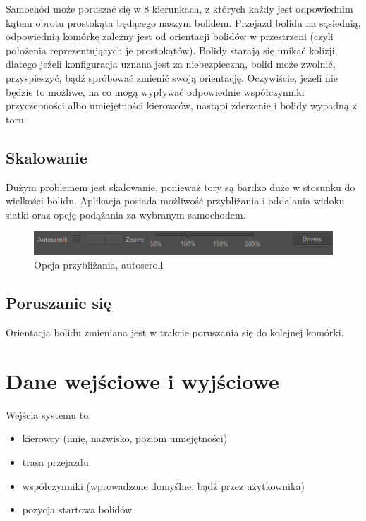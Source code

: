 \documentclass{article}
\begin{document}
Samochód może poruszać się w 8 kierunkach, z których każdy jest odpowiednim kątem obrotu prostokąta będącego naszym bolidem. Przejazd bolidu na sąsiednią, odpowiednią komórkę zależny jest od orientacji bolidów w przestrzeni (czyli położenia reprezentujących je prostokątów). Bolidy starają się unikać kolizji, dlatego jeżeli konfiguracja uznana jest za niebezpieczną, bolid może zwolnić, przyspieszyć, bądź spróbować zmienić swoją orientację. Oczywiście, jeżeli nie będzie to możliwe, na co mogą wypływać odpowiednie współczynniki przyczepności albo umiejętności kierowców, nastąpi zderzenie i bolidy wypadną z toru.   \\

\subsection{Skalowanie}
Dużym problemem jest skalowanie, ponieważ tory są bardzo duże w stosunku do wielkości bolidu. Aplikacja posiada możliwość przybliżania i oddalania widoku siatki oraz opcję podążania za wybranym samochodem.

\begin{figure}[h]
\begin{center}
\includegraphics[scale=0.8]{scroll.png}
\caption{Opcja przybliżania, autoscroll}
\end{center}
\end{figure}


\subsection{Poruszanie się}
Orientacja bolidu zmieniana jest w trakcie poruszania się do kolejnej komórki.


\section{Dane wejściowe i wyjściowe}
Wejścia systemu to:
\begin{itemize}
\item kierowcy (imię, nazwisko, poziom umiejętności)
\item trasa przejazdu
\item współczynniki (wprowadzone domyślne, bądź przez użytkownika)
\item pozycja startowa bolidów
\end{itemize}
\end{document}

